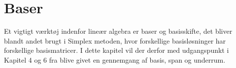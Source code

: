 \chapter{Baser}
Et vigtigt værktøj indenfor lineær algebra er baser og basisskifte, det bliver blandt andet brugt i Simplex metoden, hvor forskellige basisløsninger har forskellige basismatricer. 
I dette kapitel vil der derfor med udgangspunkt i Kapitel 4 og 6 fra \citet{lial}
blive givet en gennemgang af basis, span og underrum. \\





